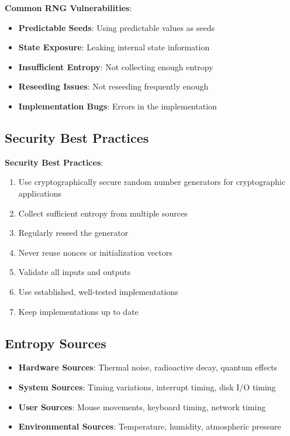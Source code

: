 \documentclass[11pt,a4paper]{article}
\begin{document}
\begin{warningbox}
\textbf{Common RNG Vulnerabilities}:
\begin{itemize}
    \item \textbf{Predictable Seeds}: Using predictable values as seeds
    \item \textbf{State Exposure}: Leaking internal state information
    \item \textbf{Insufficient Entropy}: Not collecting enough entropy
    \item \textbf{Reseeding Issues}: Not reseeding frequently enough
    \item \textbf{Implementation Bugs}: Errors in the implementation
\end{itemize}
\end{warningbox}

\subsection{Security Best Practices}

\begin{prosbox}
\textbf{Security Best Practices}:
\begin{enumerate}
    \item Use cryptographically secure random number generators for cryptographic applications
    \item Collect sufficient entropy from multiple sources
    \item Regularly reseed the generator
    \item Never reuse nonces or initialization vectors
    \item Validate all inputs and outputs
    \item Use established, well-tested implementations
    \item Keep implementations up to date
\end{enumerate}
\end{prosbox}

\subsection{Entropy Sources}

\begin{itemize}
    \item \textbf{Hardware Sources}: Thermal noise, radioactive decay, quantum effects
    \item \textbf{System Sources}: Timing variations, interrupt timing, disk I/O timing
    \item \textbf{User Sources}: Mouse movements, keyboard timing, network timing
    \item \textbf{Environmental Sources}: Temperature, humidity, atmospheric pressure
\end{itemize}
\end{document}

